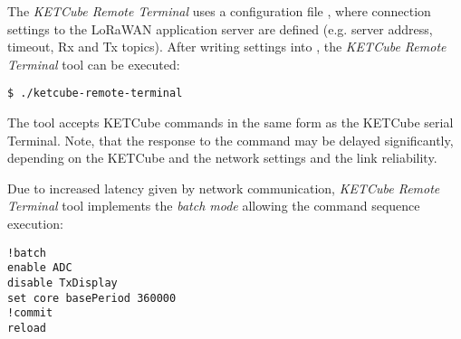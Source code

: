 The {\it KETCube Remote Terminal} uses a configuration file , where connection settings to the LoRaWAN application server are defined (e.g. server address, timeout, Rx and Tx topics). After writing settings into , the {\it KETCube Remote Terminal} tool can be executed:

\begin{Verbatim}[frame=single, fontsize=\small]
$ ./ketcube-remote-terminal
\end{Verbatim}

The tool accepts KETCube commands in the same form as the KETCube serial Terminal. Note, that the response to the command may be delayed significantly, depending on the KETCube and the network settings and the link reliability. 

Due to increased latency given by network communication, {\it KETCube Remote Terminal} tool implements the {\it batch mode} allowing the command sequence execution:

\begin{Verbatim}[frame=single, fontsize=\small]
!batch
enable ADC
disable TxDisplay
set core basePeriod 360000
!commit
reload
\end{Verbatim}






\clearpage





